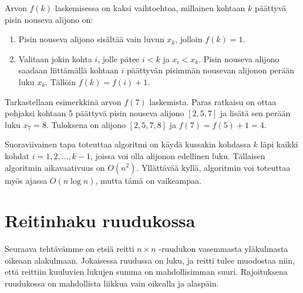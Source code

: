 Arvon $f(k)$ laskemisessa on kaksi vaihtoehtoa,
millainen kohtaan $k$ päättyvä pisin nouseva alijono on:
\begin{enumerate}
\item Pisin nouseva alijono sisältää vain luvun $x_k$,
jolloin $f(k)=1$.
\item Valitaan jokin kohta $i$, jolle pätee $i<k$
ja $x_i<x_k$.
Pisin nouseva alijono saadaan liittämällä
kohtaan $i$ päättyvän pisimmän nousevan alijonon perään luku $x_k$.
Tällöin $f(k)=f(i)+1$.
\end{enumerate}

Tarkastellaan esimerkkinä arvon $f(7)$ laskemista.
Paras ratkaisu on ottaa pohjaksi kohtaan 5
päättyvä pisin nouseva alijono $[2,5,7]$
ja lisätä sen perään luku $x_7=8$.
Tuloksena on alijono $[2,5,7,8]$ ja $f(7)=f(5)+1=4$.

Suoraviivainen tapa toteuttaa algoritmi on
käydä kussakin kohdassa $k$ läpi kaikki kohdat
$i=1,2,\ldots,k-1$, joissa voi olla alijonon
edellinen luku.
Tällaisen algoritmin aikavaativuus on $O(n^2)$.
Yllättävää kyllä, algoritmin voi toteuttaa myös
ajassa $O(n \log n)$, mutta tämä on vaikeampaa.

\section{Reitinhaku ruudukossa}

Seuraava tehtävämme on etsiä reitti
$n \times n$ -ruudukon vasemmasta yläkulmasta
oikeaan alakulmaan.
Jokaisessa ruudussa on luku, ja reitti
tulee muodostaa niin, että reittiin kuuluvien
lukujen summa on mahdollisimman suuri.
Rajoituksena ruudukossa on mahdollista
liikkua vain oikealla ja alaspäin.

